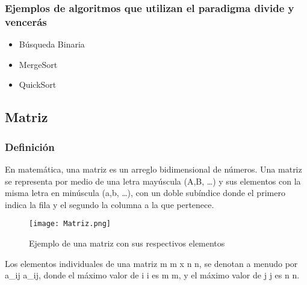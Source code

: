 \documentclass[12pt,twoside]{article}
\begin{document}
\subsubsection{Ejemplos de algoritmos que utilizan el paradigma divide y vencerás}
\begin{itemize}
    \item Búsqueda Binaria
    \item MergeSort
    \item QuickSort
\end{itemize}

\subsection{Matriz}
\subsubsection{Definición}
En matemática, una matriz es un arreglo bidimensional de números. Una matriz se representa por medio de una letra mayúscula (A,B, …) y sus elementos con la misma letra en minúscula (a,b, …), con un doble subíndice donde el primero indica la fila y el segundo la columna a la que pertenece.
\begin{center}
  \begin{figure}[H]
    \centering
    \texttt{[image: Matriz.png]}%
    \caption{Ejemplo de una matriz con sus respectivos elementos}
    \label{hug1}
\end{figure}
\end{center}
Los elementos individuales de una matriz {\displaystyle m} m x {\displaystyle n} n, se denotan a menudo por {\displaystyle a_{ij}} a_{ij}, donde el máximo valor de {\displaystyle i} i es {\displaystyle m} m, y el máximo valor de {\displaystyle j} j es {\displaystyle n} n.
\end{document}
